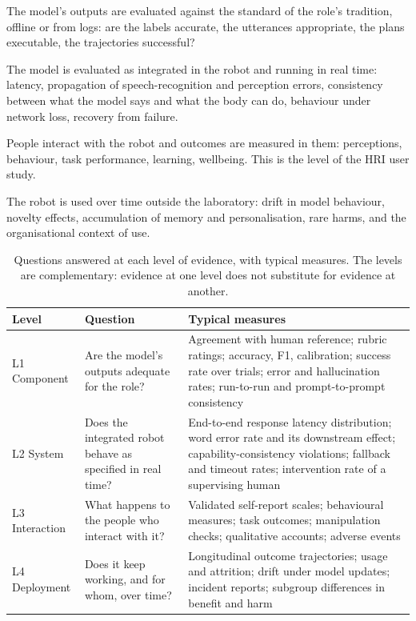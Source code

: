\begin{description}[leftmargin=1.2em, style=sameline]
\item[L1 Component.] The model's outputs are evaluated against the standard of
the role's tradition, offline or from logs: are the labels accurate, the
utterances appropriate, the plans executable, the trajectories successful?
\item[L2 System.] The model is evaluated as integrated in the robot and
running in real time: latency, propagation of speech-recognition and
perception errors, consistency between what the model says and what the body
can do, behaviour under network loss, recovery from failure.
\item[L3 Interaction.] People interact with the robot and outcomes are
measured in them: perceptions, behaviour, task performance, learning,
wellbeing. This is the level of the HRI user study.
\item[L4 Deployment.] The robot is used over time outside the laboratory:
drift in model behaviour, novelty effects, accumulation of memory and
personalisation, rare harms, and the organisational context of use.
\end{description}

\begin{table}[t]
\caption{Questions answered at each level of evidence, with typical measures.
The levels are complementary: evidence at one level does not substitute for
evidence at another.}
\label{tab:levels}
\small
\begin{tabularx}{\textwidth}{@{}L{1.9cm}L{4.3cm}Y@{}}
\toprule
Level & Question & Typical measures \\
\midrule
L1 Component & Are the model's outputs adequate for the role? & Agreement
with human reference; rubric ratings; accuracy, F1, calibration; success rate
over trials; error and hallucination rates; run-to-run and prompt-to-prompt
consistency \\
L2 System & Does the integrated robot behave as specified in real time? &
End-to-end response latency distribution; word error rate and its downstream
effect; capability-consistency violations; fallback and timeout rates;
intervention rate of a supervising human \\
L3 Interaction & What happens to the people who interact with it? &
Validated self-report scales; behavioural measures; task outcomes;
manipulation checks; qualitative accounts; adverse events \\
L4 Deployment & Does it keep working, and for whom, over time? & Longitudinal
outcome trajectories; usage and attrition; drift under model updates; incident
reports; subgroup differences in benefit and harm \\
\bottomrule
\end{tabularx}
\end{table}


